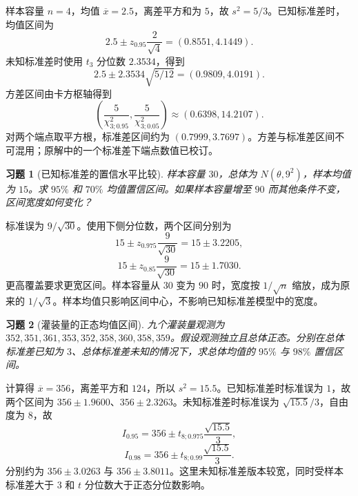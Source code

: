 \documentclass[12pt,fontset=fandol]{ctexart}
\newtheorem{exercise}{习题}[section]
\begin{document}
\begin{solve}\label{a:M-C22-1}样本容量 $n=4$，均值 $\overline x=2.5$，离差平方和为 $5$，故 $s^2=5/3$。已知标准差时，均值区间为\[2.5\pm z_{0.95}\frac2{\sqrt4}=(0.8551,4.1449).\]未知标准差时使用 $t_3$ 分位数 $2.3534$，得到\[2.5\pm2.3534\sqrt{5/12}=(0.9809,4.0191).\]方差区间由卡方枢轴得到\[\left(\frac5{\chi^2_{3;0.95}},\frac5{\chi^2_{3;0.05}}\right)\approx(0.6398,14.2107).\]对两个端点取平方根，标准差区间约为 $(0.7999,3.7697)$。方差与标准差区间不可混用；原解中的一个标准差下端点数值已校订。\end{solve}

\begin{exercise}[已知标准差的置信水平比较]\label{q:M-P10-1}
样本容量 $30$，总体为 $N(\theta,9^2)$，样本均值为 $15$。求 $95\%$ 和 $70\%$ 均值置信区间。如果样本容量增至 $90$ 而其他条件不变，区间宽度如何变化？\par{}
\end{exercise}

\begin{solve}\label{a:M-P10-1}标准误为 $9/\sqrt{30}$。使用下侧分位数，两个区间分别为\[15\pm z_{0.975}\frac9{\sqrt{30}}=15\pm3.2205,\]\[15\pm z_{0.85}\frac9{\sqrt{30}}=15\pm1.7030.\]更高覆盖要求更宽区间。样本容量从 $30$ 变为 $90$ 时，宽度按 $1/\sqrt n$ 缩放，成为原来的 $1/\sqrt3$。样本均值只影响区间中心，不影响已知标准差模型中的宽度。\end{solve}

\begin{exercise}[灌装量的正态均值区间]\label{q:M-P10-2}
九个灌装量观测为 $352,351,361,353,352,358,360,358,359$。假设观测独立且总体正态。分别在总体标准差已知为 $3$、总体标准差未知的情况下，求总体均值的 $95\%$ 与 $98\%$ 置信区间。\par{}
\end{exercise}

\begin{solve}\label{a:M-P10-2}计算得 $\overline x=356$，离差平方和 $124$，所以 $s^2=15.5$。已知标准差时标准误为 $1$，故两个区间为 $356\pm1.9600$、$356\pm2.3263$。未知标准差时标准误为 $\sqrt{15.5}/3$，自由度为 $8$，故\[I_{0.95}=356\pm t_{8;0.975}\frac{\sqrt{15.5}}3,\]\[I_{0.98}=356\pm t_{8;0.99}\frac{\sqrt{15.5}}3.\]分别约为 $356\pm3.0263$ 与 $356\pm3.8011$。这里未知标准差版本较宽，同时受样本标准差大于 $3$ 和 $t$ 分位数大于正态分位数影响。\end{solve}
\end{document}
